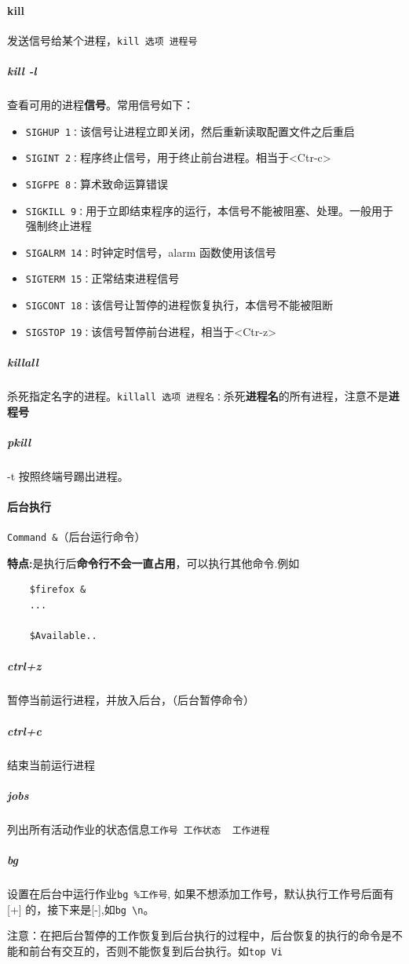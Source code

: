 \documentclass[UTF8,a4paper,12pt]{ctexbook}
\begin{document}
		\paragraph{kill}发送信号给某个进程，\verb|kill 选项 进程号|
			\subparagraph{kill -l} 查看可用的进程\textbf{信号}。常用信号如下：
				\begin{itemize}
					\item \verb|SIGHUP 1：|该信号让进程立即关闭，然后重新读取配置文件之后重启
					\item \verb|SIGINT 2：|程序终止信号，用于终止前台进程。相当于<Ctr-c>
					\item \verb|SIGFPE 8：|算术致命运算错误
					\item \verb|SIGKILL 9：|用于立即结束程序的运行，本信号不能被阻塞、处理。一般用于强制终止进程
					\item \verb|SIGALRM 14：|时钟定时信号，alarm 函数使用该信号
					\item \verb|SIGTERM 15：|正常结束进程信号
					\item \verb|SIGCONT 18：|该信号让暂停的进程恢复执行，本信号不能被阻断
					\item \verb|SIGSTOP 19：|该信号暂停前台进程，相当于<Ctr-z>									
				\end{itemize}
			
			\subparagraph{killall} 杀死指定名字的进程。\verb|killall 选项 进程名：|杀死\textbf{进程名}的所有进程，注意不是\textbf{进程号}
			
			\subparagraph{pkill} -t 按照终端号踢出进程。	
			
		\paragraph{后台执行}
				\verb|Command &|（后台运行命令）
				
				\textbf{特点:}是执行后\textbf{命令行不会一直占用}，可以执行其他命令.例如
				\begin{lstlisting}
	$firefox &
	...
	
	$Available..
				\end{lstlisting}
				
			\subparagraph{ctrl+z} 暂停当前运行进程，并放入后台，（后台暂停命令）
			\subparagraph{ctrl+c} 结束当前运行进程
			\subparagraph{jobs}列出所有活动作业的状态信息\verb|工作号 工作状态  工作进程|
			
			\subparagraph{bg}设置在后台中运行作业\verb|bg %工作号|, 如果不想添加工作号，默认执行工作号后面有[+] 的，接下来是[-],如\verb|bg \n|。
			
				注意：在把后台暂停的工作恢复到后台执行的过程中，后台恢复的执行的命令是不能和前台有交互的，否则不能恢复到后台执行。如\verb|top Vi|
			
\end{document}
